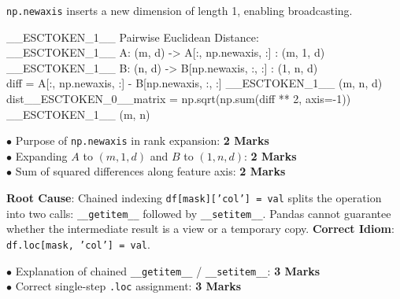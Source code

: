 \begin{solutionbox}
\texttt{np.newaxis} inserts a new dimension of length 1, enabling broadcasting.
\begin{pycode}
\_\_ESCTOKEN\_1\_\_ Pairwise Euclidean Distance:\\
\_\_ESCTOKEN\_1\_\_ A: (m, d) -> A[:, np.newaxis, :] : (m, 1, d)\\
\_\_ESCTOKEN\_1\_\_ B: (n, d) -> B[np.newaxis, :, :] : (1, n, d)\\
diff = A[:, np.newaxis, :] - B[np.newaxis, :, :] \_\_ESCTOKEN\_1\_\_ (m, n, d)\\
dist\_\_ESCTOKEN\_0\_\_matrix = np.sqrt(np.sum(diff ** 2, axis=-1)) \_\_ESCTOKEN\_1\_\_ (m, n)
\end{pycode}
\begin{markingrubric}
$\bullet$ Purpose of \texttt{np.newaxis} in rank expansion: \textbf{2 Marks}\\
$\bullet$ Expanding $A$ to $(m, 1, d)$ and $B$ to $(1, n, d)$: \textbf{2 Marks}\\
$\bullet$ Sum of squared differences along feature axis: \textbf{2 Marks}
\end{markingrubric}
\end{solutionbox}

\begin{solutionbox}
\textbf{Root Cause}: Chained indexing \texttt{df[mask]['col'] = val} splits the operation into two calls: \texttt{\_\_getitem\_\_} followed by \texttt{\_\_setitem\_\_}. Pandas cannot guarantee whether the intermediate result is a view or a temporary copy.
\textbf{Correct Idiom}: \texttt{df.loc[mask, 'col'] = val}.
\begin{markingrubric}
$\bullet$ Explanation of chained \texttt{\_\_getitem\_\_} / \texttt{\_\_setitem\_\_}: \textbf{3 Marks}\\
$\bullet$ Correct single-step \texttt{.loc} assignment: \textbf{3 Marks}
\end{markingrubric}
\end{solutionbox}

